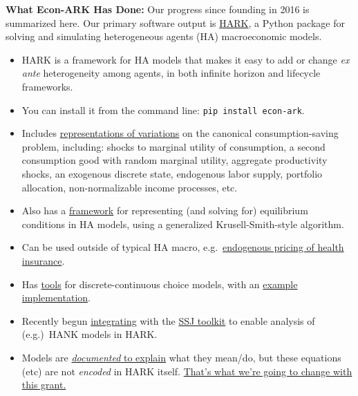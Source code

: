 \documentclass[12pt,pdftex,letterpaper]{article}
\begin{document}
\vspace{0.5cm}

\noindent \textbf{What Econ-ARK Has Done:} Our progress since founding in 2016 is summarized here. Our primary software output is \href{https://github.com/econ-ark/HARK}{HARK}, a Python package for solving and simulating heterogeneous agents (HA) macroeconomic models.

\begin{itemize} 
	\item HARK is a framework for HA models that makes it easy to add or change \textit{ex ante} heterogeneity among agents, in both infinite horizon and lifecycle frameworks.
	
	\item You can install it from the command line: \texttt{pip install econ-ark}.
	
	\item Includes \href{https://docs.econ-ark.org/Documentation/reference/index.html}{representations of variations} on the canonical consumption-saving problem, including: shocks to marginal utility of consumption, a second consumption good with random marginal utility, aggregate productivity shocks, an exogenous discrete state, endogenous labor supply, portfolio allocation, non-normalizable income processes, etc.
	
	\item Also has a \href{https://docs.econ-ark.org/Documentation/reference/tools/core.html#HARK.core.Market}{framework} for representing (and solving for) equilibrium conditions in HA models, using a generalized Krusell-Smith-style algorithm.
	
	\item Can be used outside of typical HA macro, e.g.\ \href{http://www.mnwhite.org/DynInsSelPaper.pdf}{endogenous pricing of health insurance}.
	
	\item Has \href{https://github.com/econ-ark/HARK/blob/master/HARK/dcegm.py}{tools} for discrete-continuous choice models, with an \href{https://econ-ark.org/materials/endogenousretirement/}{example implementation}.
	
	\item Recently begun \href{https://docs.econ-ark.org/examples/ConsNewKeynesianModel/SSJ_example.html}{integrating} with the \href{https://github.com/shade-econ/sequence-jacobian}{SSJ toolkit} to enable analysis of (e.g.)\ HANK models in HARK.
	
	\item Models are \href{https://docs.econ-ark.org/Documentation/reference/ConsumptionSaving/ConsRiskyAssetModel.html#HARK.ConsumptionSaving.ConsRiskyAssetModel.IndShockRiskyAssetConsumerType}{\textit{documented} to explain} what they mean/do, but these equations (etc) are not \textit{encoded} in HARK itself. \underline{That's what we're going to change with this grant.}
\end{itemize}
\end{document}
